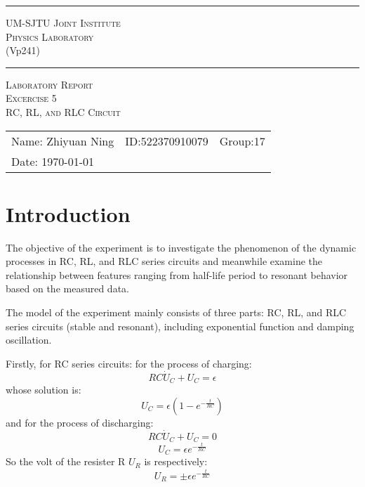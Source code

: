 \documentclass[12pt, a4paper, oneside]{article}
\begin{document}
\begin{center}
  \rule{\textwidth}{1pt}\par
  \vspace{5mm}
  {\large\scshape UM-SJTU Joint Institute}\\[\baselineskip]
  {\large\scshape Physics Laboratory}\\
  (Vp241)
  \rule{\textwidth}{1pt}\par
  \vspace{4cm}
  {\large\scshape Laboratory Report}\\[\baselineskip]
  {\large\scshape Excercise 5}\\[\baselineskip]
  {\large\scshape RC, RL, and RLC Circuit
  }\\[\baselineskip]
\end{center}
\vspace{7cm}

\begin{tabular}{lll}
  Name: 			Zhiyuan Ning & ID:522370910079 & Group:17 \\
  Date: {\today}        &                 &          \\
\end{tabular}


\rightline{\footnotesize[rev4.1]}
\pagebreak

\section{Introduction}
The objective of the experiment is to investigate the phenomenon of the dynamic processes in RC, RL, and RLC series circuits and meanwhile examine the relationship between features ranging from half-life period to resonant behavior based on the measured data.

The model of the experiment mainly consists of three parts: RC, RL, and RLC series circuits (stable and resonant), including exponential function and damping oscillation.

Firstly, for RC series circuits: for the process of charging:
\begin{equation}
  RC \dot U_C +  U_C = \epsilon
\end{equation}
whose solution is:
\begin{equation}
  U_C = \epsilon(1-e^{-\frac{t}{RC}})
\end{equation}
and for the process of discharging:
\begin{equation}
  RC \dot U_C +  U_C = 0
\end{equation}
\begin{equation}
  U_C = \epsilon e^{-\frac{t}{RC}}
\end{equation}
So the volt of the resister R $U_R$ is respectively:
\begin{equation}
  U_R = \pm \epsilon e^{-\frac{t}{RC}}
\end{equation}
\end{document}
